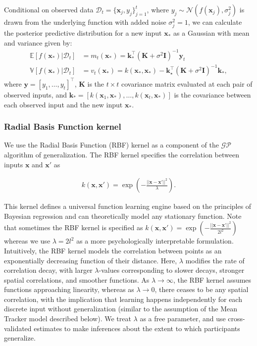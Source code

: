 Conditional on observed data $\mathcal{D}_t=\{\mathbf{x}_j, y_j\}_{j=1}^t$, where $y_j \sim \mathcal{N}(f(\mathbf{x}_j),\sigma_j^2)$ is drawn from the underlying function with added noise $\sigma_j^2=1$, we can calculate the posterior predictive distribution for a new input $\mathbf{x}_\ast$ as a Gaussian with mean and variance given by:
\begin{align}
\mathbb{E}[f(\mathbf{x}_\ast)|\mathcal{D}_t]&=m_t(\mathbf{x}_\ast) = \mathbf{k}_\ast^\top (\mathbf{K}+\sigma^2\mathbf{I})^{-1}\mathbf{y}_t \\
\mathbb{V}[f(\mathbf{x}_\ast)|\mathcal{D}_t]&=v_t(\mathbf{x}_\ast) = k(\mathbf{x}_\ast,\mathbf{x}_\ast)-\mathbf{k}_\star^\top(\mathbf{K}+\sigma^2\mathbf{I})^{-1}\mathbf{k}_\ast,
\end{align}
where $\mathbf{y} = [y_1,\ldots,y_t]^\top$, $\mathbf{K}$ is the $t \times t$ covariance matrix evaluated at each pair of observed inputs, and $\mathbf{k}_\ast = [k(\mathbf{x}_1,\mathbf{x}_\ast),\ldots,k(\mathbf{x}_t,\mathbf{x}_\ast)]$ is the covariance between each observed input and the new input $\mathbf{x}_\ast$.

\subsubsection{Radial Basis Function kernel} 
We use the Radial Basis Function (RBF) kernel as a component of the $\mathcal{GP}$ algorithm of generalization. The RBF kernel specifies the correlation between inputs $\mathbf{x}$ and $\mathbf{x}'$ as

\begin{align}
k(\mathbf{x}, \mathbf{x}')=\exp\left(-\frac{||\mathbf{x}-\mathbf{x}'||^2}{\lambda}\right).
\end{align}

This kernel defines a universal function learning engine based on the principles of Bayesian regression and can theoretically model any stationary function. Note that sometimes the RBF kernel is specified as $k(\mathbf{x}, \mathbf{x}')=\exp\left(-\frac{||\mathbf{x}-\mathbf{x}'||^2}{2l^2}\right)$ whereas we use $\lambda = 2l^2$ as a more psychologically interpretable formulation. Intuitively, the RBF kernel models the correlation between points as an exponentially decreasing function of their distance. Here, $\lambda$ modifies the rate of correlation decay, with larger $\lambda$-values corresponding to slower decays, stronger spatial correlations, and smoother functions. As $\lambda \to \infty$, the RBF kernel assumes functions approaching linearity, whereas as $\lambda \to 0$, there ceases to be any spatial correlation, with the implication that learning happens independently for each discrete input without generalization (similar to the assumption of the Mean Tracker model described below). We treat $\lambda$ as a free parameter, and use cross-validated estimates to make inferences about the extent to which participants generalize.

